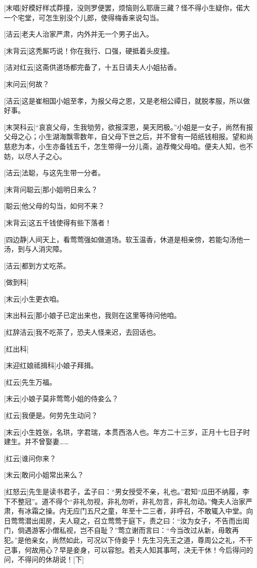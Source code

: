 \documentclass{book}
\begin{document}
[末唱]好模好样忒莽撞，没则罗便罢，烦恼则么耶唐三藏？怪不得小生疑你，偌大一个宅堂，可怎生别没个儿郎，使得梅香来说勾当。

[洁云]老夫人治家严肃，内外并无一个男子出入。

[末背云]这秃厮巧说！你在我行、口强，硬抵着头皮撞。

[洁对红云]这斋供道场都完备了，十五日请夫人小姐拈香。

[末问云]何故？

[洁云]这是崔相国小姐至孝，为报父母之恩，又是老相公禫日，就脱孝服，所以做好事。

[末哭科云]``哀哀父母，生我劬劳，欲报深恩，昊天罔极。''小姐是一女子，尚然有报父母之心；小生湖海飘零数年，自父母下世之后，并不曾有一陌纸钱相报。望和尚慈悲为本，小生亦备钱五千，怎生带得一分儿斋，追荐俺父母咱。便夫人知，也不妨，以尽人子之心。

[洁云]法聪，与这先生带一分者。

[末背问聪云]那小姐明日来么？

[聪云]他父母的勾当，如何不来？

[末背云]这五千钱使得有些下落者！

[四边静]人间天上，看莺莺强如做道场。软玉温香，休道是相亲傍，若能勾汤他一汤，到与人消灾障。

[洁云]都到方丈吃茶。

[做到科]

[末云]小生更衣咱。

[末出科云]那小娘子已定出来也，我则在这里等待问他咱。

[红辞洁云]我不吃茶了，恐夫人怪来迟，去回话也。

[红出科]

[末迎红娘祗揖科]小娘子拜揖。

[红云]先生万福。

[末云]小娘子莫非莺莺小姐的侍妾么？

[红云]我便是。何劳先生动问？

[末云]小生姓张，名珙，字君瑞，本贯西洛人也。年方二十三岁，正月十七日子时建生。并不曾娶妻……

[红云]谁问你来？

[末云]敢问小姐常出来么？

[红怒云]先生是读书君子，孟子曰：``男女授受不亲，礼也。''君知``瓜田不纳履，李下不整冠''。道不得个``非礼勿视，非礼勿听，非礼勿言，非礼勿动。''俺夫人治家严肃，有冰霜之操。内无应门五尺之童，年至十二三者，非呼召，不敢辄入中堂。向日莺莺潜出闺房，夫人窥之，召立莺莺于庭下，责之曰：``汝为女子，不告而出闺门，倘遇游客小僧私视，岂不自耻？''莺立谢而言曰：``今当改过从新，毋敢再犯。''是他亲女，尚然如此，可况以下侍妾乎！先生习先王之道，尊周公之礼，不干己事，何故用心？早是妾身，可以容恕。若夫人知其事呵，决无干休！今后得问的问，不得问的休胡说！[下]
\end{document}
